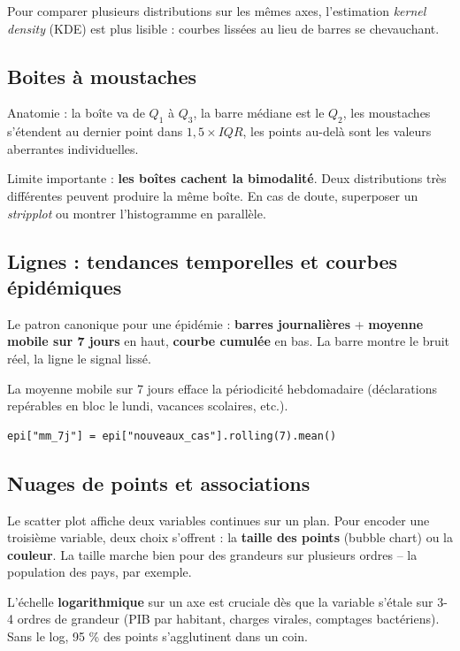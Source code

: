 \documentclass[11pt,a4paper]{article}
\begin{document}
Pour comparer plusieurs distributions sur les m\^emes axes, l'estimation
\emph{kernel density} (KDE) est plus lisible : courbes liss\'ees au lieu
de barres se chevauchant.

\subsection{Boites \`a moustaches}

Anatomie : la bo\^ite va de $Q_1$ \`a $Q_3$, la barre m\'ediane est le
$Q_2$, les moustaches s'\'etendent au dernier point dans
$1{,}5 \times IQR$, les points au-del\`a sont les valeurs aberrantes
individuelles.

Limite importante : \textbf{les bo\^ites cachent la bimodalit\'e}. Deux
distributions tr\`es diff\'erentes peuvent produire la m\^eme bo\^ite. En
cas de doute, superposer un \emph{stripplot} ou montrer l'histogramme en
parall\`ele.

\subsection{Lignes : tendances temporelles et courbes \'epid\'emiques}

Le patron canonique pour une \'epid\'emie : \textbf{barres journali\`eres}
+ \textbf{moyenne mobile sur 7 jours} en haut, \textbf{courbe cumul\'ee}
en bas. La barre montre le bruit r\'eel, la ligne le signal liss\'e.

La moyenne mobile sur 7 jours efface la p\'eriodicit\'e hebdomadaire
(d\'eclarations rep\'erables en bloc le lundi, vacances scolaires, etc.).

\begin{verbatim}
epi["mm_7j"] = epi["nouveaux_cas"].rolling(7).mean()
\end{verbatim}

\subsection{Nuages de points et associations}

Le scatter plot affiche deux variables continues sur un plan. Pour
encoder une troisi\`eme variable, deux choix s'offrent : la \textbf{taille
des points} (bubble chart) ou la \textbf{couleur}. La taille marche bien
pour des grandeurs sur plusieurs ordres -- la population des pays, par
exemple.

L'\'echelle \textbf{logarithmique} sur un axe est cruciale d\`es que la
variable s'\'etale sur 3-4 ordres de grandeur (PIB par habitant, charges
virales, comptages bact\'eriens). Sans le log, 95 \% des points
s'agglutinent dans un coin.
\end{document}
